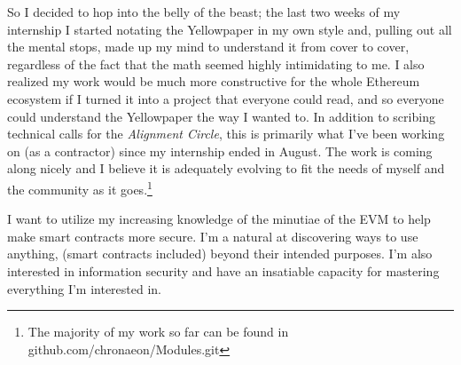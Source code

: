 \documentclass[11pt,a4paper,sans]{moderncv}
\begin{document}
So I decided to hop into the belly of the beast; the last two weeks of my internship I started notating the Yellowpaper in my own style and, pulling out all the mental stops, made up my mind to understand it from cover to cover, regardless of the fact that the math seemed highly intimidating to me. I also realized my work would be much more constructive for the whole Ethereum ecosystem if I turned it into a project that everyone could read, and so everyone could understand the Yellowpaper the way I wanted to. In addition to scribing technical calls for the \textit{Alignment Circle}, this is primarily what I've been working on (as a contractor) since my internship ended in August. The work is coming along nicely and I believe it is adequately evolving to fit the needs of myself and the community as it goes.\footnote{The majority of my work so far can be found in github.com/chronaeon/Modules.git} 

I want to utilize my increasing knowledge of the minutiae of the EVM to help make smart contracts more secure. I'm a natural at discovering ways to use anything, (smart contracts included) beyond their intended purposes. I'm also interested in information security and have an insatiable capacity for mastering everything I'm interested in.

\makeletterclosing
\end{document}
